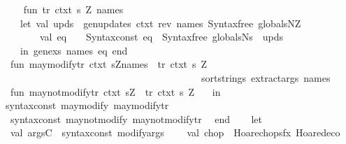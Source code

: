 \begin{isabellebody}
\isanewline
\ \ \isanewline
\ \ \ \ fun\ tr\ ctxt\ s\ Z\ names\ {\isacharequal}\isanewline
\ \ \ \ \ \ let\ val\ upds\ {\isacharequal}\ gen{\isacharunderscore}updates\ ctxt\ {\isacharparenleft}rev\ names{\isacharparenright}\ {\isacharparenleft}Syntax{\isachardot}free\ globalsN{\isachardollar}Z{\isacharparenright}{\isacharsemicolon}\isanewline
\ \ \ \ \ \ \ \ \ \ val\ eq\ \ \ {\isacharequal}\ Syntax{\isachardot}const\ eq\ {\isachardollar}\ {\isacharparenleft}Syntax{\isachardot}free\ globalsN{\isachardollar}s{\isacharparenright}\ {\isachardollar}\ upds{\isacharsemicolon}\isanewline
\ \ \ \ \ \ in\ gen{\isacharunderscore}exs\ names\ eq\ end{\isacharsemicolon}\isanewline
\isanewline
\ \ \ \ fun\ may{\isacharunderscore}modify{\isacharunderscore}tr\ ctxt\ {\isacharbrackleft}s{\isacharcomma}Z{\isacharcomma}names{\isacharbrackright}\ {\isacharequal}\ tr\ ctxt\ s\ Z\ \isanewline
\ \ \ \ \ \ \ \ \ \ \ \ \ \ \ \ \ \ \ \ \ \ \ \ \ \ \ \ \ \ \ \ \ \ \ \ \ \ \ \ \ \ \ {\isacharparenleft}sort{\isacharunderscore}strings\ {\isacharparenleft}extract{\isacharunderscore}args\ names{\isacharparenright}{\isacharparenright}\isanewline
\ \ \ \ fun\ may{\isacharunderscore}not{\isacharunderscore}modify{\isacharunderscore}tr\ ctxt\ {\isacharbrackleft}s{\isacharcomma}Z{\isacharbrackright}\ {\isacharequal}\ tr\ ctxt\ s\ Z\ {\isacharbrackleft}{\isacharbrackright}\isanewline
\ \ in\isanewline
\ \ \ {\isacharbrackleft}{\isacharparenleft}{\isacharat}{\isacharbraceleft}syntax{\isacharunderscore}const\ {\isachardoublequote}{\isacharunderscore}may{\isacharunderscore}modify{\isachardoublequote}{\isacharbraceright}{\isacharcomma}\ may{\isacharunderscore}modify{\isacharunderscore}tr{\isacharparenright}{\isacharcomma}\isanewline
\ \ \ \ {\isacharparenleft}{\isacharat}{\isacharbraceleft}syntax{\isacharunderscore}const\ {\isachardoublequote}{\isacharunderscore}may{\isacharunderscore}not{\isacharunderscore}modify{\isachardoublequote}{\isacharbraceright}{\isacharcomma}\ may{\isacharunderscore}not{\isacharunderscore}modify{\isacharunderscore}tr{\isacharparenright}{\isacharbrackright}\isanewline
\ \ end{\isacharsemicolon}\isanewline
{\isacartoucheclose}\isanewline
\isanewline
\isanewline
{}\isamarkupfalse%
\ {\isacartoucheopen}\isanewline
\ \ let\isanewline
\ \ \ \ val\ argsC\ {\isacharequal}\ {\isacharat}{\isacharbraceleft}syntax{\isacharunderscore}const\ {\isachardoublequote}{\isacharunderscore}modifyargs{\isachardoublequote}{\isacharbraceright}{\isacharsemicolon}\isanewline
\ \ \ \ val\ chop\ {\isacharequal}\ Hoare{\isachardot}chopsfx\ Hoare{\isachardot}deco{\isacharsemicolon}\isanewline

\end{isabellebody}
